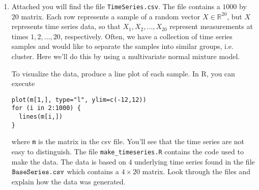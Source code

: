 \documentclass{article}
\begin{document}
\begin{enumerate}
\item Attached you will find the file \verb+TimeSeries.csv+.  The file contains a $1000$ by $20$ matrix.  Each row represents a sample of a random vector $X \in \mathbb{R}^{20}$, but $X$ represents time series data, so that $X_1, X_2, \dots, X_{20}$ represent measurements at times $1, 2, \dots, 20$, respectively.  Often, we have a collection of time series samples and would like to separate the samples into similar groups, i.e. cluster.  Here we'll do this by using a multivariate normal mixture model.  

To visualize the data, produce a line plot of each sample.  In R, you can execute
\begin{verbatim}
plot(m[1,], type="l", ylim=c(-12,12))
for (i in 2:1000) {
  lines(m[i,])
}
\end{verbatim}
where \verb+m+ is the matrix in the csv file.  You'll see that the time series are not easy to distinguish.  The file \verb+make_timeseries.R+ contains the code used to make the data.  The data is based on $4$ underlying time series found in the file $\verb+BaseSeries.csv+$ which contains a $4 \times 20$ matrix.   Look through the files and explain how the data was generated.  


\end{enumerate}
\end{document}
